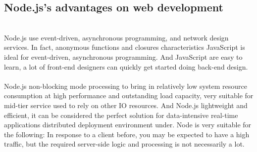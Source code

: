 \subsection{ Node.js's advantages on web development}
\\
Node.js use event-driven, asynchronous programming, and network design services. In fact, anonymous functions and closures characteristics JavaScript is ideal for event-driven, asynchronous programming. And JavaScript are easy to learn, a lot of front-end designers can quickly get started doing back-end design.\\
\\
Node.js non-blocking mode processing to bring in relatively low system resource consumption at high performance and outstanding load capacity, very suitable for mid-tier service used to rely on other IO resources. And Node.js lightweight and efficient, it can be considered the perfect solution for data-intensive real-time applications distributed deployment environment under. Node is very suitable for the following: In response to a client before, you may be expected to have a high traffic, but the required server-side logic and processing is not necessarily a lot.\\
\\
